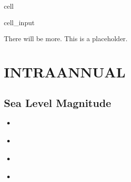 \documentclass[letterpaper,10pt,english]{jupyterBook}
\begin{document}
\begin{sphinxuseclass}{cell}\begin{sphinxVerbatimInput}

\begin{sphinxuseclass}{cell_input}
\begin{sphinxVerbatim}[commandchars=\\\{\}]
\end{sphinxVerbatim}

\end{sphinxuseclass}\end{sphinxVerbatimInput}

\end{sphinxuseclass}
\sphinxAtStartPar
There will be more. This is a placeholder.

\sphinxstepscope


\part{INTRA\sphinxhyphen{}ANNUAL}

\sphinxstepscope


\chapter{Sea Level Magnitude}
\label{\detokenize{notebooks/SL_intra-annual:sea-level-magnitude}}\label{\detokenize{notebooks/SL_intra-annual::doc}}\begin{itemize}
\item {} 
\sphinxAtStartPar
{\hyperref[\detokenize{notebooks/regional_and_local/SL_anomaly_intra-annual::doc}]{}}

\item {} 
\sphinxAtStartPar
{\hyperref[\detokenize{notebooks/regional_and_local/SL_Rankings_intra-annual::doc}]{}}

\item {} 
\sphinxAtStartPar
{\hyperref[\detokenize{notebooks/regional_and_local/SL_Extremes_intra-annual::doc}]{}}

\item {} 
\sphinxAtStartPar
{\hyperref[\detokenize{notebooks/regional_and_local/SL_Components_intra-annual::doc}]{}}

\end{itemize}
\end{document}
